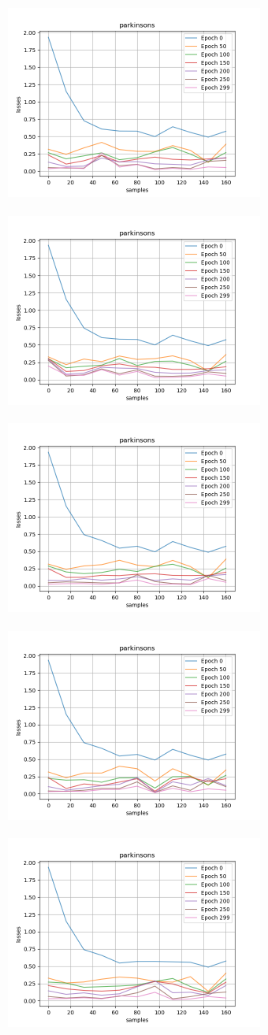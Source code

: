 \includegraphics[width=0.5\textwidth]{./figures/proj_parkinsons_3.png}

\includegraphics[width=0.5\textwidth]{./figures/proj_parkinsons_4.png}

\includegraphics[width=0.5\textwidth]{./figures/proj_parkinsons_5.png}

\includegraphics[width=0.5\textwidth]{./figures/proj_parkinsons_6.png}

\includegraphics[width=0.5\textwidth]{./figures/proj_parkinsons_7.png}

